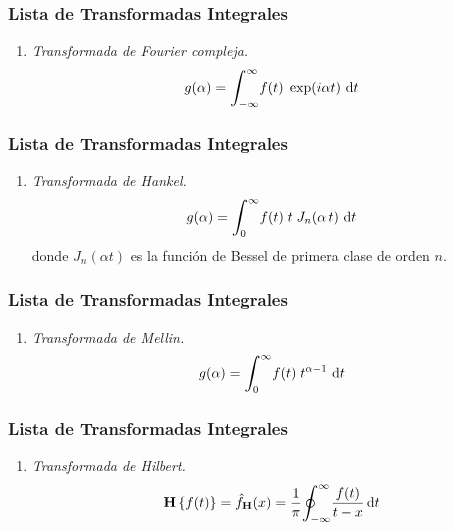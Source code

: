 \documentclass[12pt]{beamer}
\begin{document}
\begin{frame}
\frametitle{Lista de Transformadas Integrales}
\begin{enumerate}[<+->]
\conti
\item \emph{Transformada de Fourier compleja.}
\begin{align}
g (\alpha)= \scaleint{6ex}_{\bs -\infty}^{\infty} f (t) \; \exp(i \alpha t) \, \dd{t}
\label{eq:ecuacion_7_04}
\end{align}
\seti
\end{enumerate}
\end{frame}
\begin{frame}
\frametitle{Lista de Transformadas Integrales}
\begin{enumerate}[<+->]
\conti
\item \emph{Transformada de Hankel.}
\begin{align}
g (\alpha)= \scaleint{6ex}_{\bs 0}^{\infty} f (t) \; t \; J_{n} (\alpha \, t) \, \dd{t}
\label{eq:ecuacion_7_05}
\end{align}
donde $J_{n} (\alpha t)$ es la función de Bessel de primera clase de orden $n$.
\seti
\end{enumerate}
\end{frame}
\begin{frame}
\frametitle{Lista de Transformadas Integrales}
\begin{enumerate}[<+->]
\conti
\item \emph{Transformada de Mellin.}
\begin{align}
g (\alpha)= \scaleint{6ex}_{\bs 0}^{\infty} f (t) \; t^{\alpha-1} \, \dd{t}
\label{eq:ecuacion_7_06}
\end{align}
\seti
\end{enumerate}
\end{frame}
\begin{frame}
\frametitle{Lista de Transformadas Integrales}
\begin{enumerate}[<+->]
\conti
\item \emph{Transformada de Hilbert.}
\begin{align}
\mathbf{H} \left\{ f (t) \right\} = \hat{f}_{\mathbf{H}} (x) = \dfrac{1}{\pi} \scaleoint{6ex}_{\bs -\infty}^{\infty} \dfrac{f (t)}{t - x} \dd{t}
\label{eq:ecuacion_9_2_1}
\end{align}
\seti
\end{enumerate}
\end{frame}
\end{document}
